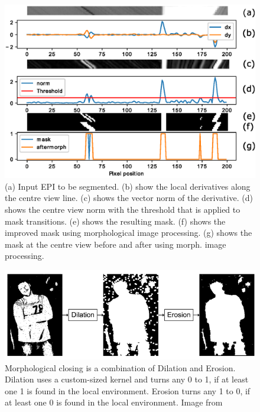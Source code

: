 \documentclass  [
  paper    = a4,
  BCOR     = 10mm,
  twoside,
  fontsize = 12pt,
  fleqn,
  toc      = bibnumbered,
  toc      = listofnumbered,
  numbers  = noendperiod,
  headings = normal,
  listof   = leveldown,
  version  = 3.03
]                                       {scrreprt}
\begin{document}
\begin{figure}
	\centering
	\includegraphics[width=1\linewidth]{images/derivatives_full}
	\caption[Segmenting an EPI]{(a) Input EPI to be segmented. (b) show the local derivatives along the centre view line. (c) shows the vector norm of the derivative. (d) shows the centre view norm with the threshold that is applied to mask transitions. (e) shows the resulting mask. (f) shows the improved mask using morphological image processing. (g) shows the mask at the centre view before and after using morph. image processing. }
	\label{fig:derivativesfull}

\end{figure}
\begin{figure}
	\centering
	\includegraphics[width=0.7\linewidth]{images/closing}
	\caption[Morphological closing]{Morphological closing is a combination of Dilation and Erosion. Dilation uses a custom-sized kernel and turns any 0 to 1, if at least one 1 is found in the local environment. Erosion turns any 1 to 0, if at least one 0 is found in the local environment. Image from \cite{what-when-how.com}}
	\label{fig:closing}
\end{figure}
\end{document}
